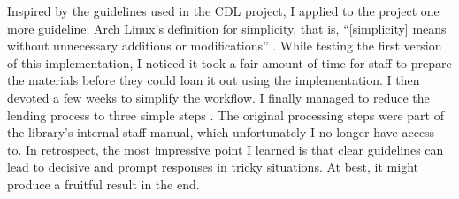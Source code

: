 \documentclass[12pt,a4paper]{article}
\begin{document}
Inspired by the guidelines used in the CDL project, I applied to the project one more guideline: Arch Linux’s definition for simplicity, that is, “[simplicity] means without unnecessary additions or modifications” \parencite{Archwiki}. While testing the first version of this implementation, I noticed it took a fair amount of time for staff to prepare the materials before they could loan it out using the implementation. I then devoted a few weeks to simplify the workflow. I finally managed to reduce the lending process to three simple steps \parencite{Linerre2023}. The original processing steps were part of the library’s internal staff manual, which unfortunately I no longer have access to.
In retrospect, the most impressive point I learned is that clear guidelines can lead to decisive and prompt responses in tricky situations. At best, it might produce a fruitful result in the end.

\printbibliography
\end{document}
